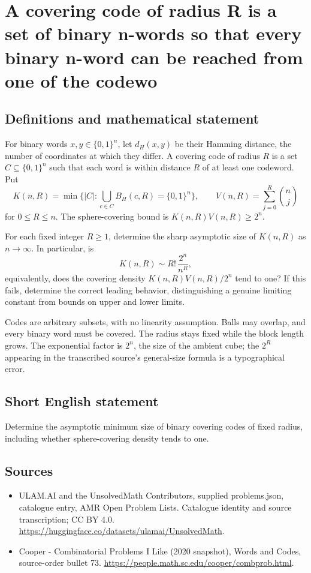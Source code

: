 \documentclass[11pt,a4paper]{article}
\begin{document}
\section*{A covering code of radius R is a set of binary n-words so that every binary n-word can be reached from one of the codewo}\label{statement}

\subsection{Definitions and mathematical statement}
For binary words $x,y\in\{0,1\}^n$, let $d_H(x,y)$ be their
Hamming distance, the number of coordinates at which they differ.
A covering code of radius $R$ is a set $C\subseteq\{0,1\}^n$
such that each word is within distance $R$ of at least one
codeword. Put
\[
 K(n,R)=\min\{|C|:\bigcup_{c\in C}B_H(c,R)=\{0,1\}^n\},
 \qquad V(n,R)=\sum_{j=0}^R\binom nj
\]
for $0\le R\le n$. The sphere-covering bound is
$K(n,R)V(n,R)\ge2^n$.

For each fixed integer $R\ge1$, determine the sharp asymptotic
size of $K(n,R)$ as $n\to\infty$. In particular, is
\[
                     K(n,R)\sim R!\,\frac{2^n}{n^R},
\]
equivalently, does the covering density
$K(n,R)V(n,R)/2^n$ tend to one? If this fails, determine the
correct leading behavior, distinguishing a genuine limiting
constant from bounds on upper and lower limits.

Codes are arbitrary subsets, with no linearity assumption.
Balls may overlap, and every binary word must be covered.
The radius stays fixed while the block length grows. The
exponential factor is $2^n$, the size of the ambient cube;
the $2^R$ appearing in the transcribed source's general-size
formula is a typographical error.
\subsection{Short English statement}
Determine the asymptotic minimum size of binary covering codes of fixed radius, including whether sphere-covering density tends to one.
\subsection{Sources}
\begin{itemize}
\item[S1] ULAM.AI and the UnsolvedMath Contributors, supplied problems.json, catalogue entry, AMR Open Problem Lists. Catalogue identity and source transcription; CC BY 4.0.
\url{https://huggingface.co/datasets/ulamai/UnsolvedMath}.
\item[S2] Cooper - Combinatorial Problems I Like (2020 snapshot), Words and Codes, source-order bullet 73. 
\url{https://people.math.sc.edu/cooper/combprob.html}.
\end{itemize}
\end{document}
